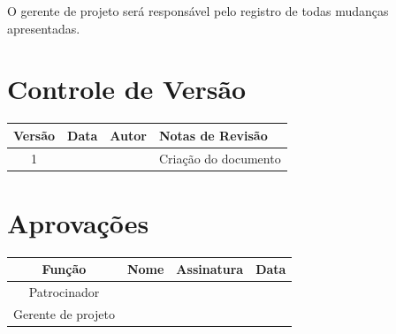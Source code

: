 O gerente de projeto será responsável pelo registro de todas mudanças apresentadas. 

\section{Controle de Versão}

\begin{table}[H]
	\begin{tabularx}{\textwidth}{| c | c | X | X |}
		\hline
		\textbf{Versão} & \textbf{Data} & \textbf{Autor}      & \textbf{Notas de Revisão} \\
		\hline
		1                &               & \projectManagerName{} & Criação do documento     \\
		\hline
	\end{tabularx}
	\centering
\end{table}

\section{Aprovações}

\begin{table}[H]
	\begin{tabularx}{\textwidth}{| c | c | X | c |}
		\hline
		\textbf{Função}  & \textbf{Nome}       & \textbf{Assinatura}      & \textbf{Data} \\
		\hline
		Patrocinador       & \projectSponsorName{} & \projectSponsorSignature{} &               \\
		\hline
		Gerente de projeto & \projectManagerName{} & \projectManagerSignature{} &               \\
		\hline
	\end{tabularx}
	\centering
\end{table}